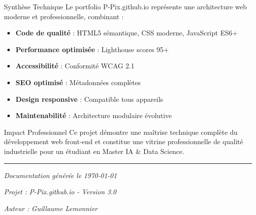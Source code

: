 \documentclass[12pt,a4paper]{article}
\begin{document}
\begin{redbox}{Synthèse Technique}
Le portfolio P-Pix.github.io représente une architecture web moderne et professionnelle, combinant :
\begin{itemize}[label=\textcolor{redcolor}{$\checkmark$}]
    \item \textbf{Code de qualité} : HTML5 sémantique, CSS moderne, JavaScript ES6+
    \item \textbf{Performance optimisée} : Lighthouse scores 95+
    \item \textbf{Accessibilité} : Conformité WCAG 2.1
    \item \textbf{SEO optimisé} : Métadonnées complètes
    \item \textbf{Design responsive} : Compatible tous appareils
    \item \textbf{Maintenabilité} : Architecture modulaire évolutive
\end{itemize}
\end{redbox}

\begin{bluebox}{Impact Professionnel}
Ce projet démontre une maîtrise technique complète du développement web front-end et constitue une vitrine professionnelle de qualité industrielle pour un étudiant en Master IA \& Data Science.
\end{bluebox}

\vspace{1cm}

\begin{center}
\textcolor{darkgray}{\rule{0.8\textwidth}{1pt}}

\vspace{0.5cm}

\textit{\color{bluecolor}Documentation générée le \today}

\textit{\color{greencolor}Projet : P-Pix.github.io - Version 3.0}

\textit{\color{redcolor}Auteur : Guillaume Lemonnier}
\end{center}
\end{document}
